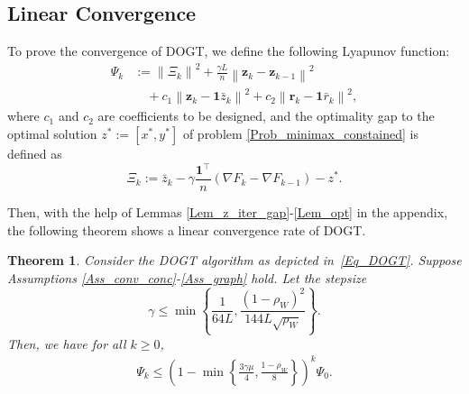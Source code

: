 \documentclass[10pt,a4paper]{amsart}
\newtheorem{Thm}{Theorem}
\begin{document}
\subsection{Linear Convergence}

To prove the convergence of DOGT, we define the following Lyapunov function:
\begin{equation}
\begin{aligned}
\varPsi _k&:=\left\| \varXi _k \right\| ^2+\frac{\gamma L}{n}\left\| \mathbf{z}_k-\mathbf{z}_{k-1} \right\| ^2
\\
&\quad+c_1\left\| \mathbf{z}_k-\mathbf{1}\bar{z}_k \right\| ^2+c_2\left\| \mathbf{r}_k-\mathbf{1}\bar{r}_k \right\| ^2,
\end{aligned}
\end{equation}
where $c_1$ and $c_2$ are coefficients to be designed, and the optimality gap to the optimal solution $z^*:=\left[ x^*,y^* \right]$ of problem \eqref{Prob_minimax_constained} is defined as
\begin{equation}\label{Eq_opt_gap}
\varXi _k:=\bar{z}_k-\gamma \frac{\mathbf{1}^{\top}}{n}\left( \nabla F_k-\nabla F_{k-1} \right) -z^*.
\end{equation}

Then, with the help of Lemmas \ref{Lem_z_iter_gap}-\ref{Lem_opt} in the appendix, the following theorem shows a linear convergence rate of DOGT.

\begin{Thm}\label{Thm_DOGT}
{Consider the DOGT algorithm as depicted in~\eqref{Eq_DOGT}.} Suppose Assumptions \ref{Ass_conv_conc}-\ref{Ass_graph} hold. Let the stepsize 
\begin{equation}\label{ss_theorem}
\gamma \leqslant \min \left\{ \frac{1}{64L}, \frac{\left( 1-\rho _W \right) ^2}{144L\sqrt{\rho _W}} \right\}.
\end{equation}
Then, we have for all $k \geqslant 0$,
\begin{equation}
\begin{aligned}
\varPsi _k\leqslant \left( 1-\min \left\{ \frac{3\gamma \mu}{4}, \frac{1-\rho _W}{8} \right\} \right) ^k\varPsi _0.
\end{aligned}
\end{equation}
\end{Thm}
\end{document}
